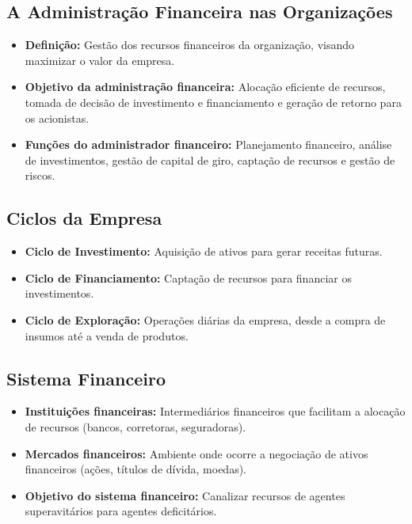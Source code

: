 \documentclass{article}
\begin{document}
\subsection{A Administração Financeira nas Organizações}
\begin{itemize}
    \item \textbf{Definição:} Gestão dos recursos financeiros da organização, visando maximizar o valor da empresa. 
    \item \textbf{Objetivo da administração financeira:} Alocação eficiente de recursos, tomada de decisão de investimento e financiamento e geração de retorno para os acionistas. 
    \item \textbf{Funções do administrador financeiro:} Planejamento financeiro, análise de investimentos, gestão de capital de giro, captação de recursos e gestão de riscos. 
\end{itemize}

\subsection{Ciclos da Empresa}
\begin{itemize}
    \item \textbf{Ciclo de Investimento:} Aquisição de ativos para gerar receitas futuras. 
    \item \textbf{Ciclo de Financiamento:} Captação de recursos para financiar os investimentos. 
    \item \textbf{Ciclo de Exploração:} Operações diárias da empresa, desde a compra de insumos até a venda de produtos. 
\end{itemize}

\subsection{Sistema Financeiro}
\begin{itemize}
    \item \textbf{Instituições financeiras:} Intermediários financeiros que facilitam a alocação de recursos (bancos, corretoras, seguradoras). 
    \item \textbf{Mercados financeiros:} Ambiente onde ocorre a negociação de ativos financeiros (ações, títulos de dívida, moedas). 
    \item \textbf{Objetivo do sistema financeiro:} Canalizar recursos de agentes superavitários para agentes deficitários. 
\end{itemize}
\end{document}
